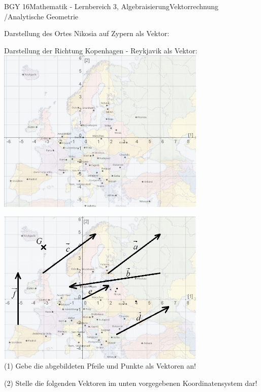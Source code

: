\documentclass[oneside,openany,headings=optiontotoc,11pt,numbers=noenddot]{scrreprt}
\begin{document}
	\begin{worksheet}{BGY 16}{Mathematik - Lernbereich 3, Algebraisierung}{Vektorrechnung /Analytische Geometrie}
				
		\noindent
		\sffamily
		\begin{framed}
			\noindent
			Darstellung des Ortes \glqq{}Nikosia\grqq{} auf Zypern als Vektor:\\
			\par
			\bigskip
			\noindent
			Darstellung der Richtung \glqq{}Kopenhagen - Reykjavik\grqq{} als Vektor:\\
			\includegraphics[width=0.75\textwidth]{Bilder/MapKoord.jpg}			
		\end{framed}
		\begin{framed}
			\noindent
			\includegraphics[width=0.75\textwidth]{Bilder/MapVec.jpg}\\
			(1) Gebe die abgebildeten Pfeile und Punkte als Vektoren an!\\
			\par
			\bigskip
			\noindent
			(2) Stelle die folgenden Vektoren im unten vorgegebenen Koordinatensystem dar!\\

\end{framed}
\end{worksheet}
\end{document}
